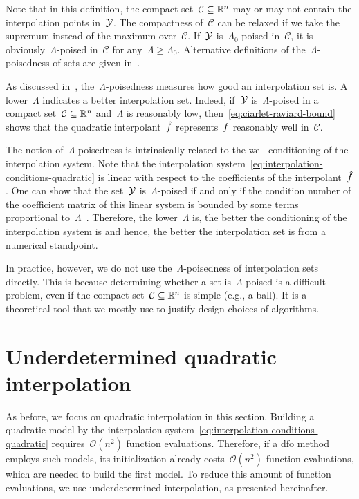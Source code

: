 Note that in this definition, the compact set~$\mathcal{C} \subseteq \mathbb{R}^n$ may or may not contain the interpolation points in~$\xpt$.
The compactness of~$\mathcal{C}$ can be relaxed if we take the supremum instead of the maximum over~$\mathcal{C}$.
If~$\xpt$ is~$\Lambda_0$-poised in~$\mathcal{C}$, it is obviously~$\Lambda$-poised in~$\mathcal{C}$ for any~$\Lambda \ge \Lambda_0$.
Alternative definitions of the~$\Lambda$-poisedness of sets are given in~\cite[\S~3.3]{Conn_Scheinberg_Vicente_2009b}.

As discussed in~\cite[\S~3.3]{Conn_Scheinberg_Vicente_2009b}, the~$\Lambda$-poisedness measures how good an interpolation set is.
A lower~$\Lambda$ indicates a better interpolation set.
Indeed, if~$\xpt$ is~$\Lambda$-poised in a compact set~$\mathcal{C} \subseteq \mathbb{R}^n$ and~$\Lambda$ is reasonably low, then~\cref{eq:ciarlet-raviard-bound} shows that the quadratic interpolant~$\objm$ represents~$f$ reasonably well in~$\mathcal{C}$.

The notion of~$\Lambda$-poisedness is intrinsically related to the well-conditioning of the interpolation system.
Note that the interpolation system~\cref{eq:interpolation-conditions-quadratic} is linear with respect to the coefficients of the interpolant~$\objm$.
One can show that the set~$\xpt$ is~$\Lambda$-poised if and only if the condition number of the coefficient matrix of this linear system is bounded by some terms proportional to~$\Lambda$~\cite[thm.~3.14]{Conn_Scheinberg_Vicente_2009b}.
Therefore, the lower~$\Lambda$ is, the better the conditioning of the interpolation system is and hence, the better the interpolation set is from a numerical standpoint.

In practice, however, we do not use the~$\Lambda$-poisedness of interpolation sets directly.
This is because determining whether a set is~$\Lambda$-poised is a difficult problem, even if the compact set~$\mathcal{C} \subseteq \mathbb{R}^n$ is simple (e.g., a ball).
It is a theoretical tool that we mostly use to justify design choices of algorithms.

\section{Underdetermined quadratic interpolation}
\label{sec:underdetermined-interpolation}

As before, we focus on quadratic interpolation in this section.
Building a quadratic model by the interpolation system~\cref{eq:interpolation-conditions-quadratic} requires~$\mathcal{O}(n^2)$ function evaluations.
Therefore, if a \gls{dfo} method employs such models, its initialization already costs~$\mathcal{O}(n^2)$ function evaluations, which are needed to build the first model.
To reduce this amount of function evaluations, we use underdetermined interpolation, as presented hereinafter.

